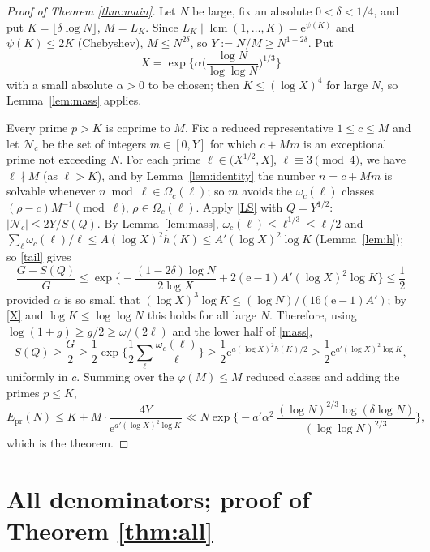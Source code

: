 \documentclass[11pt,reqno]{amsart}
\newcommand{\lcm}{\operatorname{lcm}}
\newcommand{\e}{\mathrm e}
\newcommand{\cN}{\mathcal N}
\begin{document}
\begin{proof}[Proof of Theorem \ref{thm:main}]
Let $N$ be large, fix an absolute $0<\delta<1/4$, and put
$K=\lfloor\delta\log N\rfloor$, $M=L_K$.  Since $L_K\mid\lcm(1,\dots,K)=\e^{\psi(K)}$
and $\psi(K)\le2K$ (Chebyshev), $M\le N^{2\delta}$, so $Y:=N/M\ge N^{1-2\delta}$.
Put
\begin{equation}\label{X}
 X=\exp\Big\{\alpha\Big(\frac{\log N}{\log\log N}\Big)^{1/3}\Big\}
\end{equation}
with a small absolute $\alpha>0$ to be chosen; then $K\le(\log X)^4$ for
large $N$, so Lemma~\ref{lem:mass} applies.

Every prime $p>K$ is coprime to $M$.  Fix a reduced representative
$1\le c\le M$ and let $\cN_c$ be the set of integers $m\in[0,Y]$ for which
$c+Mm$ is an exceptional prime not exceeding $N$.  For each prime
$\ell\in(X^{1/2},X]$, $\ell\equiv3\pmod 4$, we have $\ell\nmid M$ (as
$\ell>K$), and by Lemma~\ref{lem:identity} the number $n=c+Mm$ is solvable
whenever $n\bmod\ell\in\Omega_c(\ell)$; so $m$ avoids the
$\omega_c(\ell)$ classes $(\rho-c)M^{-1}\pmod\ell$, $\rho\in\Omega_c(\ell)$.
Apply \eqref{LS} with $Q=Y^{1/2}$: $|\cN_c|\le2Y/S(Q)$.  By
Lemma~\ref{lem:mass}, $\omega_c(\ell)\le\ell^{1/3}\le\ell/2$ and
$\sum_\ell\omega_c(\ell)/\ell\le A(\log X)^2h(K)\le A'(\log X)^2\log K$
(Lemma~\ref{lem:h}); so \eqref{tail} gives
\[
 \frac{G-S(Q)}{G}\le\exp\Big\{-\frac{(1-2\delta)\log N}{2\log X}+2(\e-1)A'(\log X)^2\log K\Big\}\le\frac12
\]
provided $\alpha$ is so small that $(\log X)^3\log K\le(\log N)/(16(\e-1)A')$;
by \eqref{X} and $\log K\le\log\log N$ this holds for all large $N$.
Therefore, using $\log(1+g)\ge g/2\ge\omega/(2\ell)$ and the lower half of \eqref{mass},
\[
 S(Q)\ge\frac G2\ge\frac12\exp\Big\{\frac12\sum_\ell\frac{\omega_c(\ell)}{\ell}\Big\}
 \ge\frac12\e^{a(\log X)^2h(K)/2}
 \ge\frac12\e^{a'(\log X)^2\log K},
\]
uniformly in $c$.  Summing over the $\varphi(M)\le M$ reduced classes and
adding the primes $p\le K$,
\[
 E_{\mathrm{pr}}(N)\le K+M\cdot\frac{4Y}{\e^{a'(\log X)^2\log K}}
 \ll N\exp\Big\{-a'\alpha^2\,\frac{(\log N)^{2/3}\log(\delta\log N)}{(\log\log N)^{2/3}}\Big\},
\]
which is the theorem.
\end{proof}

\section{All denominators; proof of Theorem \ref{thm:all}}\label{sec:all}
\end{document}
